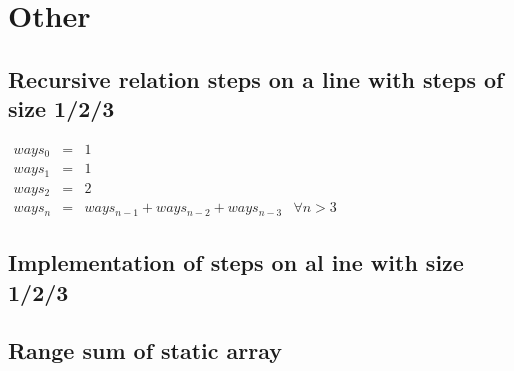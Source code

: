 \section{Other}
\subsection{Recursive relation steps on a line with steps of size 1/2/3}
\begin{math}
\begin{array}{rclr}
ways_0 & = & 1 \\
ways_1 & = & 1 \\
ways_2 & = & 2 \\
ways_n & = & ways_{n-1} + ways_{n-2} + ways_{n-3} & \forall n > 3
\end{array}
\end{math}

\subsection{Implementation of steps on al ine with size 1/2/3}



\subsection{Range sum of static array}

